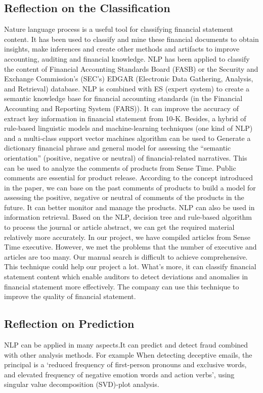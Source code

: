 \documentclass{article}
\begin{document}
\subsection{Reflection on the Classification}
Nature language process is a useful tool for classifying financial statement content. It has been used to classify and mine these financial documents to obtain insights, make inferences and create other methods and artifacts to improve accounting, auditing and financial knowledge. NLP has been applied to classify the content of Financial Accounting Standards Board (FASB) or the Security and Exchange Commission’s (SEC’s) EDGAR (Electronic Data Gathering, Analysis, and Retrieval) database. NLP is combined with ES (expert system) to create a semantic knowledge base for financial accounting standards (in the Financial Accounting and Reporting System (FARS)). It can improve the accuracy of extract key information in financial statement from 10-K. Besides, a hybrid of rule-based linguistic models and machine-learning techniques (one kind of NLP) and a multi-class support vector machines algorithm can be used to Generate a dictionary financial phrase and general model for assessing the “semantic orientation” (positive, negative or neutral) of financial-related narratives. This can be used to analyze the comments of products from Sense Time. Public comments are essential for product release. According to the concept introduced in the paper, we can base on the past comments of products to build a model for assessing the positive, negative or neutral of comments of the products in the future. It can better monitor and manage the products.  NLP can also be used in information retrieval. Based on the NLP, decision tree and rule-based algorithm to process the journal or article abstract, we can get the required material relatively more accurately. In our project, we have compiled articles from Sense Time executive. However, we met the problems that the number of executive and articles are too many. Our manual search is difficult to achieve comprehensive. This technique could help our project a lot. What’s more, it can classify financial statement content which enable auditors to detect deviations and anomalies in financial statement more effectively. The company can use this technique to improve the quality of financial statement. 
\subsection{Reflection on Prediction}
NLP can be applied in many aspects.It can predict and detect fraud combined with other analysis methods. For example When detecting deceptive emails, the principal is a ‘reduced frequency of first-person pronouns and exclusive words, and elevated frequency of negative emotion words and action verbs’, using singular value decomposition (SVD)-plot analysis.
\end{document}
